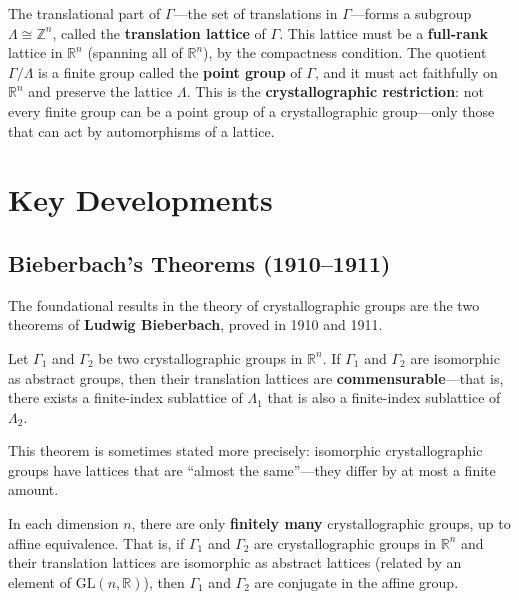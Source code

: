 The translational part of $\Gamma$---the set of translations in $\Gamma$---forms a subgroup $\Lambda \cong \mathbb{Z}^n$, called the \textbf{translation lattice} of $\Gamma$. This lattice must be a \textbf{full-rank} lattice in $\mathbb{R}^n$ (spanning all of $\mathbb{R}^n$), by the compactness condition. The quotient $\Gamma / \Lambda$ is a finite group called the \textbf{point group} of $\Gamma$, and it must act faithfully on $\mathbb{R}^n$ and preserve the lattice $\Lambda$. This is the \textbf{crystallographic restriction}: not every finite group can be a point group of a crystallographic group---only those that can act by automorphisms of a lattice.

\section{Key Developments}

\subsection{Bieberbach's Theorems (1910--1911)}

The foundational results in the theory of crystallographic groups are the two theorems of \textbf{Ludwig Bieberbach}, proved in 1910 and 1911.

\begin{theorem}\label{thm:bieberbach-1}
Let $\Gamma_1$ and $\Gamma_2$ be two crystallographic groups in $\mathbb{R}^n$. If $\Gamma_1$ and $\Gamma_2$ are isomorphic as abstract groups, then their translation lattices are \textbf{commensurable}---that is, there exists a finite-index sublattice of $\Lambda_1$ that is also a finite-index sublattice of $\Lambda_2$.
\end{theorem}

This theorem is sometimes stated more precisely: isomorphic crystallographic groups have lattices that are ``almost the same''---they differ by at most a finite amount.

\begin{theorem}\label{thm:bieberbach-2}
In each dimension $n$, there are only \textbf{finitely many} crystallographic groups, up to affine equivalence. That is, if $\Gamma_1$ and $\Gamma_2$ are crystallographic groups in $\mathbb{R}^n$ and their translation lattices are isomorphic as abstract lattices (related by an element of $\mathrm{GL}(n, \mathbb{R})$), then $\Gamma_1$ and $\Gamma_2$ are conjugate in the affine group.
\end{theorem}

